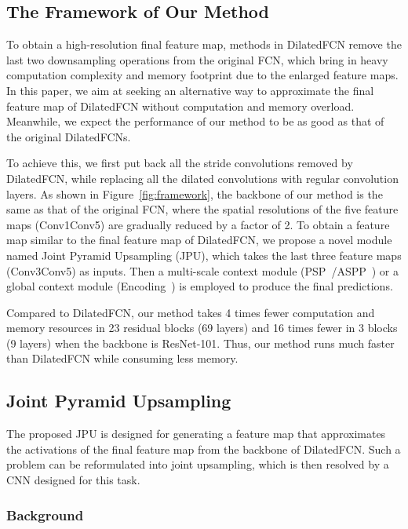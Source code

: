 \documentclass[10pt,twocolumn,letterpaper]{article}
\begin{document}
\subsection{The Framework of Our Method}
To obtain a high-resolution final feature map, methods in DilatedFCN remove the last two downsampling operations from the original FCN, which bring in heavy computation complexity and memory footprint due to the enlarged feature maps.
In this paper, we aim at seeking an alternative way to approximate the final feature map of DilatedFCN without computation and memory overload.
Meanwhile, we expect the performance of our method to be as good as that of the original DilatedFCNs.

To achieve this, we first put back all the stride convolutions removed by DilatedFCN, while replacing all the dilated convolutions with regular convolution layers.
As shown in Figure~\ref{fig:framework}, the backbone of our method is the same as that of the original FCN, where the spatial resolutions of the five feature maps (Conv1Conv5) are gradually reduced by a factor of 2.
To obtain a feature map similar to the final feature map of DilatedFCN, we propose a novel module named Joint Pyramid Upsampling (JPU), which takes the last three feature maps (Conv3Conv5) as inputs.
Then a multi-scale context module (PSP~\cite{zhao2017pyramid}/ASPP~\cite{chen2017rethinking}) or a global context module (Encoding~\cite{zhang2018context}) is employed to produce the final predictions.
 
Compared to DilatedFCN, our method takes 4 times fewer computation and memory resources in 23 residual blocks (69 layers) and 16 times fewer in 3 blocks (9 layers) when the backbone is ResNet-101.
Thus, our method runs much faster than DilatedFCN while consuming less memory.
\subsection{Joint Pyramid Upsampling}
The proposed JPU is designed for generating a feature map that approximates the activations of the final feature map from the backbone of DilatedFCN.
Such a problem can be reformulated into joint upsampling, which is then resolved by a CNN designed for this task.
\subsubsection{Background}
\end{document}
